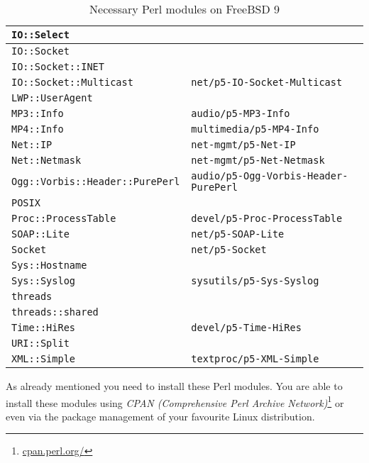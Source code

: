 \begin{table}
\begin{tabular}{|p{15em}|p{18em}|}
		\hline
		\verb|IO::Select| 										& \\
		\hline
		\verb|IO::Socket| 										& \\
		\hline
		\verb|IO::Socket::INET| 							& \\
		\hline
		\verb|IO::Socket::Multicast| 					& \verb|net/p5-IO-Socket-Multicast| \\
		\hline
		\verb|LWP::UserAgent| 								& \\
		\hline
		\verb|MP3::Info| 											& \verb|audio/p5-MP3-Info| \\
		\hline
		\verb|MP4::Info| 											& \verb|multimedia/p5-MP4-Info| \\
		\hline
		\verb|Net::IP| 												& \verb|net-mgmt/p5-Net-IP| \\
		\hline
		\verb|Net::Netmask| 									& \verb|net-mgmt/p5-Net-Netmask| \\
		\hline
		\verb|Ogg::Vorbis::Header::PurePerl|	& \verb|audio/p5-Ogg-Vorbis-Header-PurePerl| \\
		\hline
		\verb|POSIX| 													& \\
		\hline
		\verb|Proc::ProcessTable| 						& \verb|devel/p5-Proc-ProcessTable| \\
		\hline
		\verb|SOAP::Lite| 										& \verb|net/p5-SOAP-Lite| \\
		\hline
		\verb|Socket| 												& \verb|net/p5-Socket| \\
		\hline
		\verb|Sys::Hostname| 									& \\
		\hline
		\verb|Sys::Syslog| 										& \verb|sysutils/p5-Sys-Syslog| \\
		\hline
		\verb|threads| 												& \\
		\hline
		\verb|threads::shared| 								& \\
		\hline
		\verb|Time::HiRes|										& \verb|devel/p5-Time-HiRes| \\
		\hline
		\verb|URI::Split| 										& \\
		\hline
		\verb|XML::Simple| 										& \verb|textproc/p5-XML-Simple| \\
		\hline
	\end{tabular}
	\caption{Necessary Perl modules on FreeBSD 9}
	\label{tab:NecessaryPerlModulesFreeBSD9}
\end{table}

As already mentioned you need to install these Perl modules. You are able to install these modules using {\em CPAN (Comprehensive Perl Archive Network)}\footnote{\url{cpan.perl.org/}} or even via the package management of your favourite Linux distribution.

